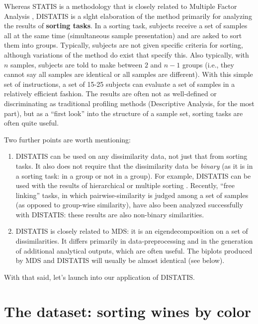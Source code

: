\documentclass[
]{book}
\providecommand{\tightlist}{%
  \setlength{\itemsep}{0pt}\setlength{\parskip}{0pt}}
\begin{document}
Whereas STATIS is a methodology that is closely related to Multiple Factor Analysis \citep[MFA:][]{abdiMultiple2013}, DISTATIS is a slght elaboration of the method primarily for analyzing the results of \textbf{sorting tasks}. In a sorting task, subjects receive a set of samples all at the same time (simultaneous sample presentation) and are asked to sort them into groups. Typically, subjects are not given specific criteria for sorting, although variations of the method do exist that specify this. Also typically, with \(n\) samples, subjects are told to make between \(2\) and \(n-1\) groups (i.e., they cannot say all samples are identical or all samples are different). With this simple set of instructions, a set of 15-25 subjects can evaluate a set of samples in a relatively efficient fashion. The results are often not as well-defined or discriminating as traditional profiling methods (Descriptive Analysis, for the most part), but as a ``first look'' into the structure of a sample set, sorting tasks are often quite useful.

Two further points are worth mentioning:

\begin{enumerate}
\def\labelenumi{\arabic{enumi}.}
\tightlist
\item
  DISTATIS can be used on any dissimilarity data, not just that from sorting tasks. It also does not require that the dissimilarity data be \emph{binary} (as it is in a sorting task: in a group or not in a group). For example, DISTATIS can be used with the results of hierarchical or multiple sorting \citep{courcouxFree2023}. Recently, ``free linking'' tasks, in which pairwise-similarity is judged among a set of samples (as opposed to group-wise similarity), have also been analyzed successfully with DISTATIS: these results are also non-binary similarities.
\item
  DISTATIS is closely related to MDS: it is an eigendecomposition on a set of dissimilarities. It differs primarily in data-preprocessing and in the generation of additional analytical outputs, which are often useful. The biplots produced by MDS and DISTATIS will usually be almost identical (see below).
\end{enumerate}

With that said, let's launch into our application of DISTATIS.

\section{The dataset: sorting wines by color}\label{the-dataset-sorting-wines-by-color}
\end{document}
